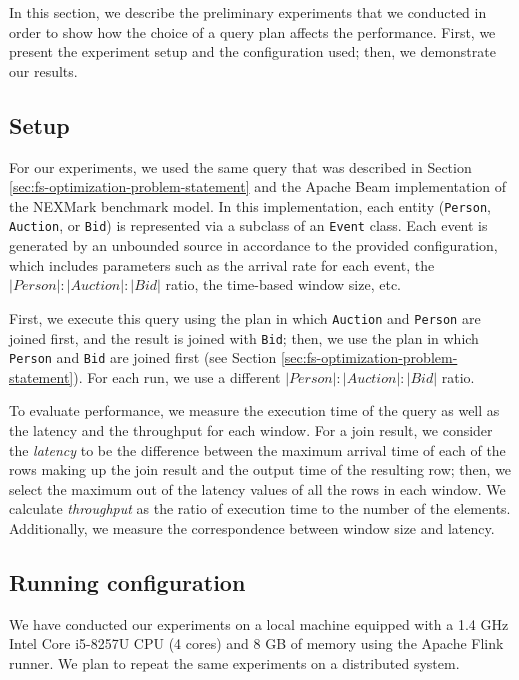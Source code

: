 \label {sec:fs-optimization-experiments}
In this section, we describe the preliminary experiments that we conducted in order to show how the choice of a query plan affects the performance. First, we present the experiment setup and the configuration used; then, we demonstrate our results.

\subsection{Setup}

For our experiments, we used the same query that was described in Section \ref{sec:fs-optimization-problem-statement} and the Apache Beam implementation of the NEXMark benchmark model. In this implementation, each entity (\texttt{Person}, \texttt{Auction}, or \texttt{Bid}) is represented via a subclass of an \texttt{Event} class. Each event is generated by an unbounded source in accordance to the provided configuration, which includes parameters such as the arrival rate for each event, the $|Person|:|Auction|:|Bid|$ ratio, the time-based window size, etc. 

First, we execute this query using the plan in which \texttt{Auction} and \texttt{Person} are joined first, and the result is joined with \texttt{Bid}; then, we use the plan in which \texttt{Person} and \texttt{Bid} are joined first (see Section  \ref{sec:fs-optimization-problem-statement}). For each run, we use a different $|Person|:|Auction|:|Bid|$ ratio.

To evaluate performance, we measure the execution time of the query as well as the latency and the throughput for each window. For a join result, we consider the \textit{latency} to be the difference between the maximum arrival time of each of the rows making up the join result and the output time of the resulting row; then, we select the maximum out of the latency values of all the rows in each window. We calculate \textit{throughput} as the ratio of execution time to the number of the elements. Additionally, we measure the correspondence between window size and latency.

\subsection{Running configuration}
We have conducted our experiments on a local machine equipped with a 1.4 GHz Intel Core i5-8257U CPU (4 cores) and 8 GB of memory using the Apache Flink runner. We plan to repeat the same experiments on a distributed system.

